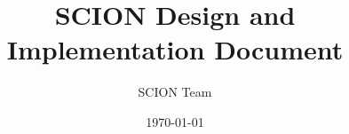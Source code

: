 \documentclass[12pt]{article}
\title{SCION Design and Implementation Document}
\author{SCION Team}
\date{\today}
\begin{document}
\maketitle
\tableofcontents
%
\newpage
\setcounter{page}{1}
%


%





%










\nocite{ZHHCPA2011}

\appendix

\printindex
\end{document}
